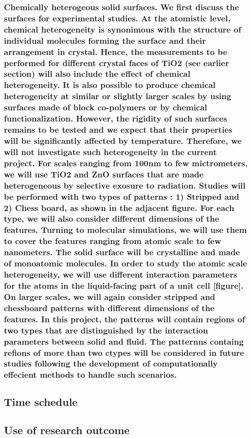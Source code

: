\documentclass[a4paper,12pt,single,pdftex]{scrartcl}
\begin{document}
{\label{ID_555034144}\subsubsection{Chemically heterogeous solid surfaces. We first discuss the surfaces for experimental studies. At the atomistic level, chemical heterogeneity is synonimous with the structure of individual molecules forming the surface and their arrangement in crystal. Hence, the measurements to be performed for different crystal faces of TiO2 (see earlier section) will also include the effect of chemical heterogeneity. It is also possible to produce chemical heterogeneity at similar or slightly larger scales by using surfaces made of block co-polymers or by chemical functionalization. However, the rigidity of such surfaces remains to be tested and we expect that their properties will be significantly affected by temperature. Therefore, we will not investigate such heterogeneity in the current project. For scales ranging from 100nm to few mictrometers, we will use TiO2 and ZnO surfaces that are made heterogeneous by selective exosure to radiation. Studies will be performed with two types of patterns : 1) Stripped and 2) Chess board, as shown in the adjacent figure. For each type, we will also consider different dimensions of the features. Turning to molecular simulations, we will use them to cover the features ranging from atomic scale to few nanometers. The solid surface will be crystalline and made of monoatomic molecules. In order to study the atomic scale heterogeneity, we will use different interaction parameters for the atoms  in the liquid-facing part of a unit cell [figure]. On larger scales, we will again consider stripped and chessboard patterns with different dimensions of the features. In this project, the patterns will contain regions of  two types that are distinguished by the interaction parameters between solid and fluid. The patternns containg refions of more than two ctypes will be considered in future studies following the development of computationally effecient methods to handle such scenarios.}

\label{ID_581300306}\subsection{Time schedule}

\label{ID_1195711759}\subsection{Use of research outcome}

}
\end{document}
